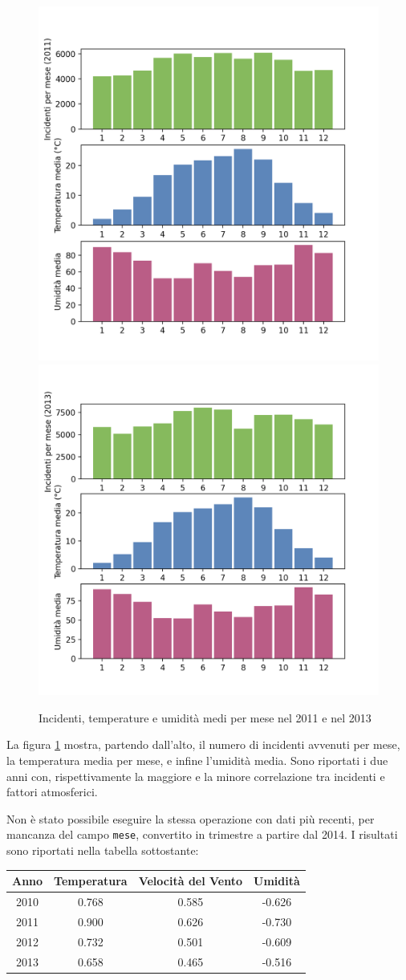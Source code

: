 \documentclass[a4paper,12pt]{report}
\newcommand{\columnstyle}[1]{\texttt{#1}}
\begin{document}
\begin{figure}
    \includegraphics[width=0.5\linewidth]{../src/meteo/temp_incidenti_2011.png}
    \includegraphics[width=0.5\linewidth]{../src/meteo/temp_incidenti_2013.png}
    \caption{Incidenti, temperature e umidità medi per mese nel 2011 e nel 2013}
    \label{fig:incidenti-temp}
\end{figure}

La figura \ref{fig:incidenti-temp} mostra, partendo dall'alto, il numero di incidenti 
avvenuti per mese, la temperatura media per mese, e infine l'umidità media.
Sono riportati i due anni con, rispettivamente la maggiore e la minore correlazione tra 
incidenti e fattori atmosferici.

Non è stato possibile eseguire la stessa operazione con dati più recenti, per mancanza del 
campo \columnstyle{mese}, convertito in trimestre a partire dal 2014.
I risultati sono riportati nella tabella sottostante: 

\begin{center}
    \def\arraystretch{1.5}%
    \begin{tabular}{ |c|c|c|c| } 
    \hline
    Anno & Temperatura & Velocità del Vento & Umidità \\ 
    \hline
    \rowcolor{TableGray}
    2010 & 0.768 & 0.585 & -0.626 \\
    2011 & 0.900 & 0.626 & -0.730 \\
    \rowcolor{TableGray}
    2012 & 0.732 & 0.501 & -0.609 \\
    2013 & 0.658 & 0.465 & -0.516 \\
    \hline
    \end{tabular}
\end{center}
\end{document}
